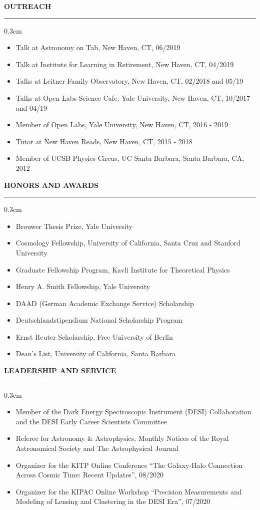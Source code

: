 \documentclass[12pt,letterpaper]{article}
\renewenvironment{section}[1]
  {
  \medskip
  {\color{blue} \MakeUppercase{\bf #1}}
  \smallskip
  \hrule
  \medskip
  \begin{adjustwidth}{0.3cm}{}
  }
  {
  \end{adjustwidth}
  }
\begin{document}
\begin{section}{Outreach}
  \begin{itemize}[leftmargin=1.0cm, topsep=0pt, itemsep=0pt, partopsep=0pt, parsep=0pt]
    \item Talk at Astronomy on Tab, New Haven, CT, 06/2019
    \item Talk at Institute for Learning in Retirement, New Haven, CT, 04/2019
    \item Talks at Leitner Family Observatory, New Haven, CT, 02/2018 and 05/19
    \item Talks at Open Labs Science Cafe, Yale University, New Haven, CT, 10/2017 and 04/19
    \item Member of Open Labs, Yale University, New Haven, CT, 2016 - 2019
    \item Tutor at New Haven Reads, New Haven, CT, 2015 - 2018
    \item Member of UCSB Physics Circus, UC Santa Barbara, Santa Barbara, CA, 2012
  \end{itemize}
\end{section}

\begin{section}{Honors and Awards}
  \begin{itemize}[leftmargin=1.0cm, topsep=0pt, itemsep=0pt, partopsep=0pt, parsep=0pt]
    \item Brouwer Thesis Prize, Yale University
    \item Cosmology Fellowship, University of California, Santa Cruz and Stanford University
    \item Graduate Fellowship Program, Kavli Institute for Theoretical Physics
    \item Henry A. Smith Fellowship, Yale University
    \item DAAD (German Academic Exchange Service) Scholarship
    \item Deutschlandstipendium National Scholarship Program
    \item Ernst Reuter Scholarship, Free University of Berlin
    \item Dean's List, University of California, Santa Barbara
  \end{itemize}
\end{section}

\begin{section}{Leadership and Service}
  \begin{itemize}[leftmargin=1.0cm, topsep=0pt, itemsep=0pt, partopsep=0pt, parsep=0pt]
    \item Member of the Dark Energy Spectroscopic Instrument (DESI) Collaboration and the DESI Early Career Scientists Committee
    \item Referee for Astronomy \& Astrophysics, Monthly Notices of the Royal Astronomical Society and The Astrophysical Journal
    \item Organizer for the KITP Online Conference ``The Galaxy-Halo Connection Across Cosmic Time: Recent Updates'', 08/2020
    \item Organizer for the KIPAC Online Workshop ``Precision Measurements and Modeling of Lensing and Clustering in the DESI Era'', 07/2020
  \end{itemize}
\end{section}
\end{document}
